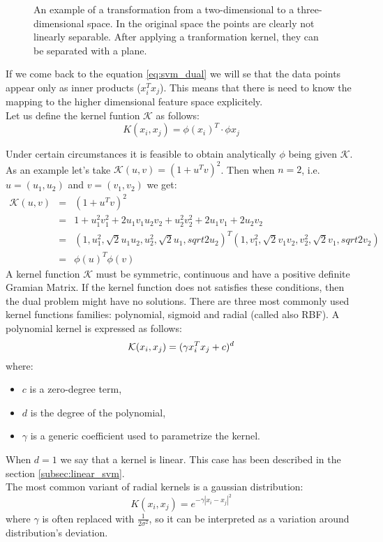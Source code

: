 \begin{figure}[htbp]
  \centering
  
  \caption{An example of a transformation from a two-dimensional to a three-dimensional space. In the original space the points are clearly not linearly separable. After applying a tranformation kernel, they can be separated with a plane.}
  \label{fig:2dto3d}
\end{figure}

If we come back to the equation \ref{eq:svm_dual} we will se that the data points appear only as inner products ($x_i^Tx_j$). This means that there is need to know the mapping to the higher dimensional feature space explicitely. \\
Let us define the kernel funtion $\mathcal{K}$ as follows:
\begin{equation}
K(x_i, x_j) = \phi(x_i)^T \cdot \phi{x_j}
\end{equation}

Under certain circumstances it is feasible to obtain analytically $\phi$ being given $\mathcal{K}$. As an example let's take $\mathcal{K}(u, v) = (1+u^Tv)^2$. Then when $n=2$, i.e. $u=(u_1,u_2)$ and $v=(v_1, v_2)$ we get:
\begin{align*}
\mathcal{K}(u, v) & = & (1+u^Tv)^2 \\
& = & 1 + u_1^2v_1^2+2u_1v_1u_2v_2+u_2^2v_2^2+2u_1v_1+2u_2v_2 \\
& = & (1, u_1^2, \sqrt{2}u_1u_2, u_2^2, \sqrt{2}u_1, sqrt{2}u_2)^T(1, v_1^2, \sqrt{2}v_1v_2, v_2^2, \sqrt{2}v_1, sqrt{2}v_2) \\
& = & \phi(u)^T\phi(v)
\end{align*}
A kernel function $\mathcal{K}$ must be symmetric, continuous and have a positive definite Gramian Matrix. If the kernel function does not satisfies these conditions, then the dual problem might have no solutions.
There are three most commonly used kernel functions families: polynomial, sigmoid and radial (called also RBF).
A polynomial kernel is expressed as follows:
\begin{equation}
\mathcal{K}(x_i, x_j) = (\gamma x_i^Tx_j + c)^d \\
\end{equation}
where:
\begin{itemize}
\item $c$ is a zero-degree term,
\item $d$ is the degree of the polynomial,
\item $\gamma$ is a generic coefficient used to parametrize the kernel.
\end{itemize}
When $d=1$ we say that a kernel is linear. This case has been described in the section \ref{subsec:linear_svm}.
\\
The most common variant of radial kernels is a gaussian distribution:
\begin{equation}
K(x_i, x_j) = e^{-\gamma|x_i-x_j|^2}
\end{equation}
where $\gamma$ is often replaced with $\frac{1}{2\sigma^2}$, so it can be interpreted as a variation around distribution's deviation.
